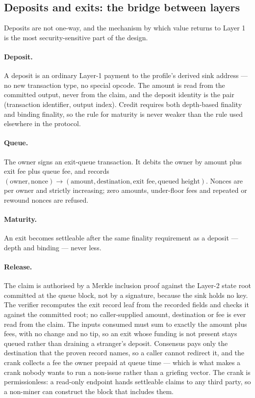 \documentclass{article}
\begin{document}
\subsection{Deposits and exits: the bridge between layers}
\label{sec:exits}

Deposits are not one-way, and the mechanism by which value returns to Layer 1
is the most security-sensitive part of the design.

\paragraph{Deposit.} A deposit is an ordinary Layer-1 payment to the profile's
derived sink address --- no new transaction type, no special opcode. The
amount is read from the committed output, never from the claim, and the
deposit identity is the pair (transaction identifier, output index). Credit
requires both depth-based finality and binding finality, so the rule for
maturity is never weaker than the rule used elsewhere in the protocol.

\paragraph{Queue.} The owner signs an exit-queue transaction. It debits the
owner by amount plus exit fee plus queue fee, and records
$(\text{owner}, \text{nonce}) \rightarrow (\text{amount}, \text{destination},
\text{exit fee}, \text{queued height})$. Nonces are per owner and strictly
increasing; zero amounts, under-floor fees and repeated or rewound nonces are
refused.

\paragraph{Maturity.} An exit becomes settleable after the same finality
requirement as a deposit --- depth and binding --- never less.

\paragraph{Release.} The claim is authorised by a Merkle inclusion proof
against the Layer-2 state root committed at the queue block, not by a
signature, because the sink holds no key. The verifier recomputes the exit
record leaf from the recorded fields and checks it against the committed root;
no caller-supplied amount, destination or fee is ever read from the claim.
The inputs consumed must sum to exactly the amount plus fees, with no change
and no tip, so an exit whose funding is not present stays queued rather than
draining a stranger's deposit. Consensus pays only the destination that the
proven record names, so a caller cannot redirect it, and the crank collects a
fee the owner prepaid at queue time --- which is what makes a crank nobody
wants to run a non-issue rather than a griefing vector. The crank is
permissionless: a read-only endpoint hands settleable claims to any third
party, so a non-miner can construct the block that includes them.
\end{document}
